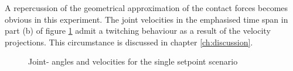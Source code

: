 A repercussion of the geometrical approximation of the contact forces becomes obvious in this experiment. The joint velocities in the emphasised time span in part (b) of figure \ref{fig:case2-1-plot} admit a twitching behaviour as a result of the velocity projections. This circumstance is discussed in chapter \ref{ch:discussion}.

\begin{figure}
    \centering
    


    \caption{Joint- angles and velocities for the single setpoint scenario}
    \label{fig:case2-1-plot}
\end{figure}


